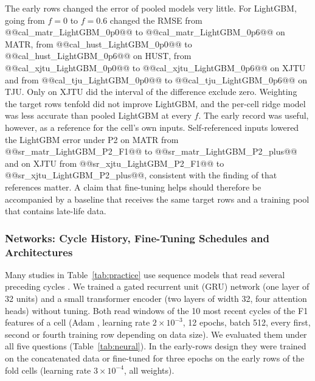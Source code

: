\documentclass{ieeeaccess}
\newcommand{\fitcol}[1]{\footnotesize\resizebox{\ifdim\width>\columnwidth\columnwidth\else\width\fi}{!}{}}
\begin{document}
The early rows changed the error of pooled models very little. For LightGBM, going from $f=0$ to $f=0.6$ changed the RMSE from @@cal_matr_LightGBM_0p0@@ to @@cal_matr_LightGBM_0p6@@ on MATR, from @@cal_hust_LightGBM_0p0@@ to @@cal_hust_LightGBM_0p6@@ on HUST, from @@cal_xjtu_LightGBM_0p0@@ to @@cal_xjtu_LightGBM_0p6@@ on XJTU and from @@cal_tju_LightGBM_0p0@@ to @@cal_tju_LightGBM_0p6@@ on TJU. Only on XJTU did the interval of the difference exclude zero. Weighting the target rows tenfold did not improve LightGBM, and the per-cell ridge model was less accurate than pooled LightGBM at every $f$. The early record was useful, however, as a reference for the cell's own inputs. Self-referenced inputs lowered the LightGBM error under P2 on MATR from @@sr_matr_LightGBM_P2_F1@@ to @@sr_matr_LightGBM_P2_plus@@ and on XJTU from @@sr_xjtu_LightGBM_P2_F1@@ to @@sr_xjtu_LightGBM_P2_plus@@, consistent with the finding of \cite{peng2026} that references matter. A claim that fine-tuning helps should therefore be accompanied by a baseline that receives the same target rows and a training pool that contains late-life data.
\begin{table}[!tb]
\caption{RMSE (\% SOH) on the last 40\% of the rows of the fold cells when the first fraction $f$ of the rows of each target cell is added to training. Default hyperparameters, F1 features, rated label. Target-only ridge uses the early rows of the cell alone.}
\label{tab:calibration}
\centering
\fitcol{tables/calibration.tex}
\end{table}

\subsubsection{Networks: Cycle History, Fine-Tuning Schedules and Architectures}
\label{sec:res_neural}
\label{sec:res_schedules}
\label{sec:res_arch}
Many studies in Table~\ref{tab:practice} use sequence models that read several preceding cycles \cite{aud24,aud26,aud01,aud13}. We trained a gated recurrent unit (GRU) network \cite{cho2014} (one layer of 32 units) and a small transformer encoder \cite{vaswani2017} (two layers of width 32, four attention heads) without tuning. Both read windows of the 10 most recent cycles of the F1 features of a cell (Adam \cite{kingma2015}, learning rate $2\times10^{-3}$, 12 epochs, batch 512, every first, second or fourth training row depending on data size). We evaluated them under all five questions (Table~\ref{tab:neural}). In the early-rows design they were trained on the concatenated data or fine-tuned for three epochs on the early rows of the fold cells (learning rate $3\times10^{-4}$, all weights).
\begin{table}[!tb]
\caption{RMSE (\% SOH) of ridge regression, LightGBM, a GRU and a transformer under the five questions, scored on the last 40\% of each cell (the random split on its own random test rows). Default hyperparameters for ridge and LightGBM; one untuned run for the networks. Early rows: $f=0.6$ added to training by concatenation.}
\label{tab:neural}
\centering
\fitcol{tables/neural.tex}
\end{table}
\end{document}
